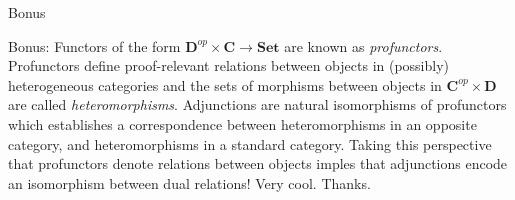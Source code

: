 \documentclass[tikz]{beamer}
\theoremstyle{definition}
\newcommand{\cat}[1]{\mathbf{#1}}
\begin{document}
\begin{frame}{Bonus}

Bonus: Functors of the form $\cat{D}^{op} \times \cat{C} \to \cat{Set}$ are known as \textit{profunctors}. Profunctors define proof-relevant relations between objects in (possibly) heterogeneous categories and the sets of morphisms between objects in $\cat{C}^{op} \times \cat{D}$ are called \textit{heteromorphisms}. Adjunctions are natural isomorphisms of profunctors which establishes a correspondence between heteromorphisms in an opposite category, and heteromorphisms in a standard category. Taking this perspective that profunctors denote relations between objects imples that adjunctions encode an isomorphism between dual relations! Very cool. Thanks.
\end{frame}
\end{document}
